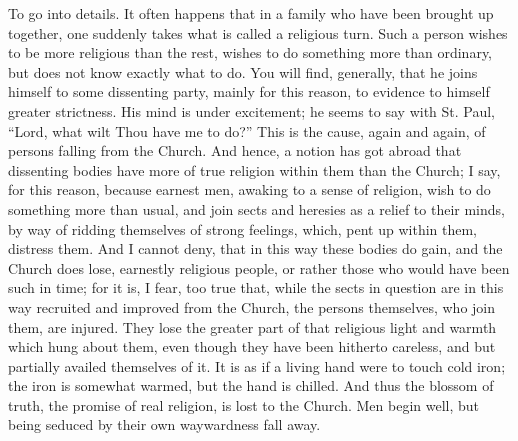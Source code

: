 To go into details. It often happens that in a family who have been
brought up together, one suddenly takes what is called a religious
turn. Such a person wishes to be more religious than the rest, wishes
to do something more than ordinary, but does not know exactly what to
do. You will find, generally, that he joins himself to some dissenting
party, mainly for this reason, to evidence to himself greater
strictness. His mind is under excitement; he seems to say with St.
Paul, ``Lord, what wilt Thou have me to do?'' This is the
cause, again and again, of persons falling from the Church. And hence,
a notion has got abroad that dissenting bodies have more of true
religion within them than the Church; I say, for this reason, because
earnest men, awaking to a sense of religion, wish to do something more
than usual, and join sects and heresies as a relief to their minds, by
way of ridding themselves of strong feelings, which, pent up within
them, distress them. And I cannot deny, that in this way these bodies
do gain, and the Church does lose, earnestly religious people, or
rather those who would have been such in time; for it is, I fear, too
true that, while the sects in question are in this way recruited and
improved from the Church, the persons themselves, who join them, are
injured. They lose the greater part of that religious light and warmth
which hung about them, even though they have been hitherto careless,
and but partially availed themselves of it. It is as if a living hand
were to touch cold iron; the iron is somewhat warmed, but the hand is
chilled. And thus the blossom of truth, the promise of real religion,
is lost to the Church. Men begin well, but being seduced by their own
waywardness fall away.

